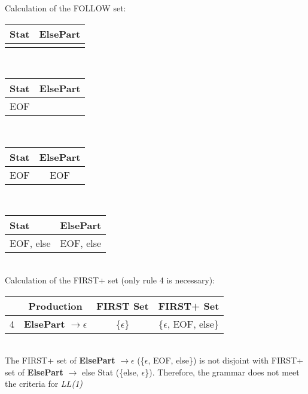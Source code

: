 \documentclass[11pt]{article} %
\begin{document}
\noindent Calculation of the FOLLOW set:\\

\begin{tabular}{|p{2cm}|c|} \hline 
\textbf{Stat}
& \textbf{ElsePart} \\\hline 

& \\\hline 
\end{tabular} \\

\begin{tabular}{|p{2cm}|c|} \hline 
\textbf{Stat}
& \textbf{ElsePart} \\\hline

EOF
& \\\hline 
\end{tabular} \\

\begin{tabular}{|p{2cm}|c|} \hline 
\textbf{Stat}
& \textbf{ElsePart} \\\hline

EOF
& EOF \\\hline 
\end{tabular} \\

\begin{tabular}{|p{2cm}|c|} \hline 
\textbf{Stat}
& \textbf{ElsePart} \\\hline 

EOF, else
& EOF, else \\\hline 
\end{tabular}\\

\noindent Calculation of the FIRST+ set (only rule 4 is necessary):\\

\begin{tabular}{|c|c|c|c|} \hline 
& Production
& FIRST Set
& FIRST+ Set \\\hline

4
& \textbf{ElsePart} $\rightarrow \epsilon$
& \{$\epsilon$\}
& \{$\epsilon$, EOF, else\} \\\hline 
\end{tabular}\\

\noindent The FIRST+ set of \textbf{ElsePart} $\rightarrow \epsilon$ (\{$\epsilon$, EOF, else\}) is not disjoint with FIRST+ set of \textbf{ElsePart} $\rightarrow$ else Stat (\{else, $\epsilon$\}). Therefore, the grammar does not meet the criteria for \textit{LL(1)}
\end{document}
